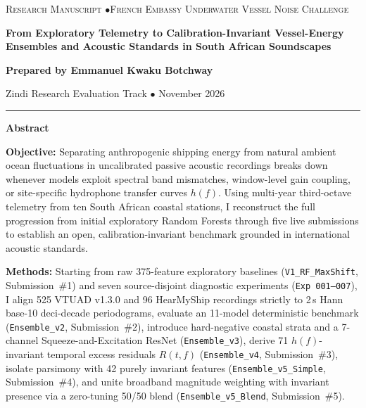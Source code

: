 \documentclass[10pt,a4paper]{article}
\begin{document}
\begin{center}
{\small\scshape\color{AccentBlue} Research Manuscript \enspace$\bullet$\enspace French Embassy Underwater Vessel Noise Challenge\par}
\vspace{0.40em}
{\Large\bfseries From Exploratory Telemetry to Calibration-Invariant Vessel-Energy\\[0.18em] Ensembles and Acoustic Standards in South African Soundscapes\par}
\vspace{0.55em}
{\large\textbf{Prepared by Emmanuel Kwaku Botchway}\par}
\vspace{0.20em}
{\small Zindi Research Evaluation Track \enspace$\bullet$ November 2026\par}
\end{center}
\vspace{0.15em}
\noindent\rule{\textwidth}{0.5pt}
\vspace{0.20em}

\begin{center}
{\large\bfseries Abstract}
\end{center}
\vspace{0.08em}

\noindent\textbf{Objective:} Separating anthropogenic shipping energy from natural ambient ocean fluctuations in uncalibrated passive acoustic recordings breaks down whenever models exploit spectral band mismatches, window-level gain coupling, or site-specific hydrophone transfer curves $h(f)$. Using multi-year third-octave telemetry from ten South African coastal stations, I reconstruct the full progression from initial exploratory Random Forests through five live submissions to establish an open, calibration-invariant benchmark grounded in international acoustic standards.

\noindent\textbf{Methods:} Starting from raw 375-feature exploratory baselines (\texttt{V1\_RF\_MaxShift}, Submission~\#1) and seven source-disjoint diagnostic experiments (\texttt{Exp 001--007}), I align 525 VTUAD v1.3.0 and 96 HearMyShip recordings strictly to 2\,s Hann base-10 deci-decade periodograms, evaluate an 11-model deterministic benchmark (\texttt{Ensemble\_v2}, Submission~\#2), introduce hard-negative coastal strata and a 7-channel Squeeze-and-Excitation ResNet (\texttt{Ensemble\_v3}), derive 71 $h(f)$-invariant temporal excess residuals $R(t,f)$ (\texttt{Ensemble\_v4}, Submission~\#3), isolate parsimony with 42 purely invariant features (\texttt{Ensemble\_v5\_Simple}, Submission~\#4), and unite broadband magnitude weighting with invariant presence via a zero-tuning 50/50 blend (\texttt{Ensemble\_v5\_Blend}, Submission~\#5).
\end{document}
